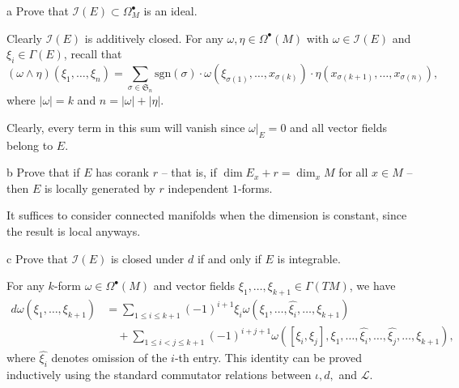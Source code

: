 \documentclass{../../templates/lkx_pset}
\begin{document}
\begin{parts}
	\begin{part}{a}
		Prove that $\mathcal{I}(E)\subset \Omega^\bullet_M$ is an ideal.
	\end{part}

	Clearly $\mathcal{I}(E)$ is additively closed. For any $\omega,\eta \in \Omega^\bullet(M)$ with $\omega\in \mathcal{I}(E)$ and $\xi_i\in \Gamma(E)$, recall that
	\[
		(\omega\wedge \eta)(\xi_1,\ldots,\xi_n) = \sum_{\sigma\in \mathfrak{S}_n} \textrm{sgn}(\sigma)\cdot \omega(\xi_{\sigma(1)},\ldots, x_{\sigma(k)})\cdot \eta(x_{\sigma(k+1)}, \ldots, x_{\sigma(n)}),
	\]
	where $|\omega|=k$ and $n=|\omega|+|\eta|$.

	Clearly, every term in this sum will vanish since $\omega|_E=0$ and all vector fields belong to $E$.

	\begin{part}{b}
		Prove that if $E$ has corank $r$ -- that is, if $\dim E_x + r =\dim_x M$ for all $x\in M$ -- then $E$ is locally generated by $r$ independent $1$-forms.
	\end{part}

	It suffices to consider connected manifolds when the dimension is constant, since the result is local anyways.

	\begin{part}{c}
		Prove that $\mathcal{I}(E)$ is closed under $d$ if and only if $E$ is integrable.
	\end{part}

	For any $k$-form $\omega\in \Omega^\bullet(M)$ and vector fields $\xi_1,\ldots,\xi_{k+1}\in \Gamma(TM)$, we have
	\[
		\begin{aligned}
			d\omega(\xi_1,\ldots,\xi_{k+1}) & = \sum_{1\leq i \leq k+1} (-1)^{i+1} \xi_i\omega(\xi_1,\ldots,\widehat{\xi_i},\ldots, \xi_{k+1})                                               \\
			                                & \quad+ \sum_{1\leq i<j\leq k+1} (-1)^{i+j+1}\omega([\xi_i, \xi_j], \xi_1, \ldots, \widehat{\xi_i},\ldots, \widehat{\xi_j}, \ldots, \xi_{k+1}),
		\end{aligned}
	\]
	where $\widehat{\xi_i}$ denotes omission of the $i$-th entry. This identity can be proved inductively using the standard commutator relations between $\iota, d,$ and $\mathcal{L}$.


\end{parts}
\end{document}
